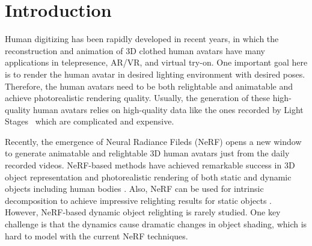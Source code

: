 \section{Introduction}
Human digitizing has been rapidly developed in recent years, in which the reconstruction and animation of 3D clothed human avatars have many applications in telepresence, AR/VR, and virtual try-on.
One important goal here is to render the human avatar in desired lighting environment with desired poses.
Therefore, the human avatars need to be both relightable and animatable and achieve photorealistic rendering quality.
Usually, the generation of these high-quality human avatars relies on high-quality data like the ones recorded by Light Stages~\cite{lightstage} which are complicated and expensive. 

Recently, the emergence of Neural Radiance Fileds (NeRF) \cite{mildenhall2020nerf} opens a new window to generate animatable and relightable 3D human avatars just from the daily recorded videos.
NeRF-based methods have achieved remarkable success in 3D object representation and photorealistic rendering of both static and dynamic objects including human bodies \cite{neuralbody, animatablenerf, hnerf, humannerf, selfrecon, neuman, ARAH, peng2022animatable, monohuman, su2023npc}.
Also, NeRF can be used for intrinsic decomposition to achieve impressive relighting results for static objects \cite{NeRFactor, NeILF, NeRD, NeRV, Neural-PIL, InvRender, tensoir}.
However, NeRF-based dynamic object relighting is rarely studied. 
One key challenge is that the dynamics cause dramatic changes in object shading, which is hard to model with the current NeRF techniques. 

